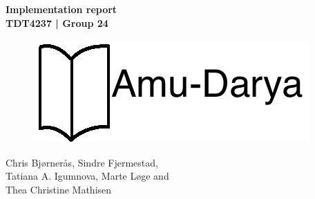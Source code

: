 \begin{titlepage}
\begin{center}

{\Huge \bf Implementation report} \\[1.0cm]
{\Large \bf TDT4237 | Group 24} \\[4.0cm]

\begin{figure}[ht!]
\centering
\includegraphics[scale=1.0]{img/amudarya.png}
\end{figure}

\vspace{3.5cm}

{Chris Bjørnerås, Sindre Fjermestad, \\
Tatiana A. Igumnova, Marte Løge and \\
Thea Christine Mathisen}


\end{center}
\end{titlepage}